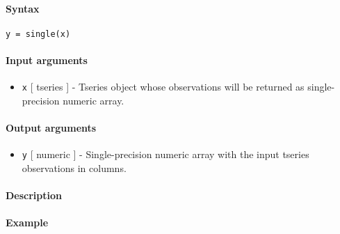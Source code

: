 


	\paragraph{Syntax}\label{syntax}

\begin{verbatim}
y = single(x)
\end{verbatim}

\paragraph{Input arguments}\label{input-arguments}

\begin{itemize}
\itemsep1pt\parskip0pt
\item
  \texttt{x} {[} tseries {]} - Tseries object whose observations will be
  returned as single-precision numeric array.
\end{itemize}

\paragraph{Output arguments}\label{output-arguments}

\begin{itemize}
\itemsep1pt\parskip0pt
\item
  \texttt{y} {[} numeric {]} - Single-precision numeric array with the
  input tseries observations in columns.
\end{itemize}

\paragraph{Description}\label{description}

\paragraph{Example}\label{example}


